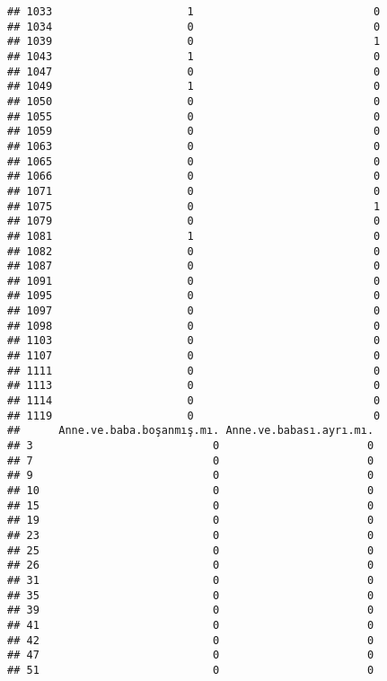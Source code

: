\documentclass[
]{article}
\begin{document}
\begin{verbatim}
## 1033                     1                            0
## 1034                     0                            0
## 1039                     0                            1
## 1043                     1                            0
## 1047                     0                            0
## 1049                     1                            0
## 1050                     0                            0
## 1055                     0                            0
## 1059                     0                            0
## 1063                     0                            0
## 1065                     0                            0
## 1066                     0                            0
## 1071                     0                            0
## 1075                     0                            1
## 1079                     0                            0
## 1081                     1                            0
## 1082                     0                            0
## 1087                     0                            0
## 1091                     0                            0
## 1095                     0                            0
## 1097                     0                            0
## 1098                     0                            0
## 1103                     0                            0
## 1107                     0                            0
## 1111                     0                            0
## 1113                     0                            0
## 1114                     0                            0
## 1119                     0                            0
##      Anne.ve.baba.boşanmış.mı. Anne.ve.babası.ayrı.mı.
## 3                            0                       0
## 7                            0                       0
## 9                            0                       0
## 10                           0                       0
## 15                           0                       0
## 19                           0                       0
## 23                           0                       0
## 25                           0                       0
## 26                           0                       0
## 31                           0                       0
## 35                           0                       0
## 39                           0                       0
## 41                           0                       0
## 42                           0                       0
## 47                           0                       0
## 51                           0                       0

\end{verbatim}
\end{document}
